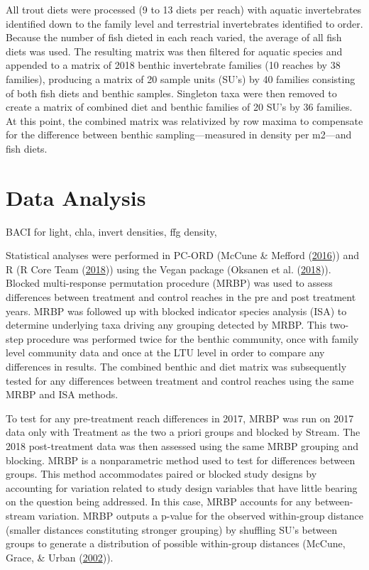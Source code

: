 \documentclass[double,12pt]{beavtex}
\begin{document}
  All trout diets were processed (9 to 13 diets per reach) with aquatic
  invertebrates identified down to the family level and terrestrial
  invertebrates identified to order. Because the number of fish dieted in
  each reach varied, the average of all fish diets was used. The resulting
  matrix was then filtered for aquatic species and appended to a matrix of
  2018 benthic invertebrate families (10 reaches by 38 families),
  producing a matrix of 20 sample units (SU's) by 40 families consisting
  of both fish diets and benthic samples. Singleton taxa were then removed
  to create a matrix of combined diet and benthic families of 20 SU's by
  36 families. At this point, the combined matrix was relativized by row
  maxima to compensate for the difference between benthic
  sampling---measured in density per m2---and fish diets.
  
  \section*{Data Analysis}\label{data-analysis}
  
  BACI for light, chla, invert densities, ffg density,
  
  Statistical analyses were performed in PC-ORD (McCune \& Mefford
  (\protect\hyperlink{ref-PC-ORD}{2016})) and R (R Core Team
  (\protect\hyperlink{ref-R-base}{2018})) using the Vegan package (Oksanen
  et al. (\protect\hyperlink{ref-vegan}{2018})). Blocked multi-response
  permutation procedure (MRBP) was used to assess differences between
  treatment and control reaches in the pre and post treatment years. MRBP
  was followed up with blocked indicator species analysis (ISA) to
  determine underlying taxa driving any grouping detected by MRBP. This
  two-step procedure was performed twice for the benthic community, once
  with family level community data and once at the LTU level in order to
  compare any differences in results. The combined benthic and diet matrix
  was subsequently tested for any differences between treatment and
  control reaches using the same MRBP and ISA methods.
  
  To test for any pre-treatment reach differences in 2017, MRBP was run on
  2017 data only with Treatment as the two a priori groups and blocked by
  Stream. The 2018 post-treatment data was then assessed using the same
  MRBP grouping and blocking. MRBP is a nonparametric method used to test
  for differences between groups. This method accommodates paired or
  blocked study designs by accounting for variation related to study
  design variables that have little bearing on the question being
  addressed. In this case, MRBP accounts for any between-stream variation.
  MRBP outputs a p-value for the observed within-group distance (smaller
  distances constituting stronger grouping) by shuffling SU's between
  groups to generate a distribution of possible within-group distances
  (McCune, Grace, \& Urban (\protect\hyperlink{ref-McCune2002}{2002})).
  
\end{document}
